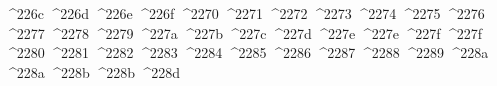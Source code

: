 {  ^^^^226c%
  ^^^^226d%
  ^^^^226e%
  ^^^^226f%
  ^^^^2270%
  ^^^^2271%
  ^^^^2272%
  ^^^^2273%
  ^^^^2274%
  ^^^^2275%
  ^^^^2276%
  ^^^^2277%
  ^^^^2278%
  ^^^^2279%
  ^^^^227a%
  ^^^^227b%
  ^^^^227c%
  ^^^^227d%
  ^^^^227e%
  ^^^^227e%
  ^^^^227f%
  ^^^^227f%
  ^^^^2280%
  ^^^^2281%
  ^^^^2282%
  ^^^^2283%
  ^^^^2284%
  ^^^^2285%
  ^^^^2286%
  ^^^^2287%
  ^^^^2288%
  ^^^^2289%
  ^^^^228a%
  ^^^^228a%
  ^^^^228b%
  ^^^^228b%
  ^^^^228d%
}
